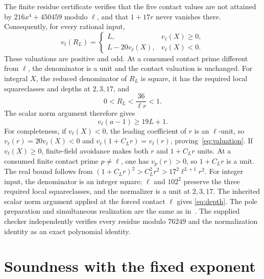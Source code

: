 \documentclass[11pt,a4paper]{article}
\begin{document}
The finite residue certificate verifies that the five contact
values are not attained by $216x^4+450459$ modulo $\ell$,
and that $1+17r$ never vanishes there. Consequently, for every
rational input,
\begin{equation}\label{eq:valuation}
 v_\ell(R_L)=
 \begin{cases}
 L,&v_\ell(X)\ge0,\\
 L-20v_\ell(X),&v_\ell(X)<0.
 \end{cases}
\end{equation}
These valuations are positive and odd. At a consumed contact
prime different from $\ell$, the denominator is a unit and the
contact valuation is unchanged. For integral $X$, the reduced
denominator of $R_L$ is square, it has the required local
squareclasses and depths at $2,3,17$, and
\[
 0<R_L<\frac{36}{\ell r}<1.
\]
The scalar norm argument therefore gives
\begin{equation}\label{eq:depth}
 v_\ell(a-1)\ge19L+1.
\end{equation}
For completeness, if $v_\ell(X)<0$, the leading coefficient of
$r$ is an $\ell$-unit, so $v_\ell(r)=20v_\ell(X)<0$ and
$v_\ell(1+C_Lr)=v_\ell(r)$, proving~\eqref{eq:valuation}.
If $v_\ell(X)\ge0$, finite-field avoidance makes both $r$
and $1+C_Lr$ units. At a consumed finite contact prime
$p\ne\ell$, one has $v_p(r)>0$, so $1+C_Lr$ is a unit.
The real bound follows from
$(1+C_Lr)^2>C_L^2r^2>17^2\ell^{L+1}r^2$.
For integer input, the denominator is an integer square;
$\ell$ and $102^2$ preserve the three required local squareclasses,
and the normalizer is a unit at $2,3,17$. The inherited scalar
norm argument applied at the forced contact $\ell$ gives
\eqref{eq:depth}. The pole preparation and simultaneous realization
are the same as in~\cite{Baseline}. The supplied
checker independently verifies every residue modulo $76249$
and the normalization identity as an exact polynomial identity.

\section{Soundness with the fixed exponent}
\end{document}
